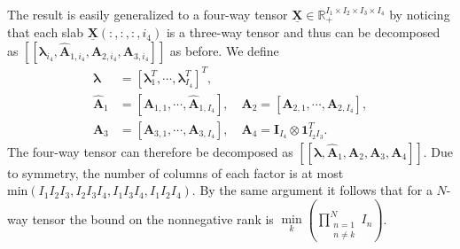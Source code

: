 \documentclass[journal]{IEEEtran}
\begin{document}
{\begin{IEEEproof}
The result is easily generalized to a {four-way} tensor $\underline{\mathbf{X}} \in \mathbb{R}_+^{I_1 \times I_2 \times I_3 \times I_4}$ by noticing that each slab  $\underline{\mathbf{X}}(:,:,:,i_4)$ is a {three-way} tensor and thus can be decomposed as $[\![\boldsymbol{\lambda}_{i_4},\widehat{\mathbf{A}}_{1,i_4},\mathbf{A}_{2,i_4},\mathbf{A}_{3,i_4}]\!]$ as before. We define
\begin{equation*}
\begin{aligned}
\boldsymbol{\lambda} &= [\boldsymbol{\lambda}_1^T,\cdots,\boldsymbol{\lambda}_{I_4}^T]^T, \\ 
\widehat{\mathbf{A}}_1 &= [\widehat{\mathbf{A}}_{1,1},  \cdots, \widehat{\mathbf{A}}_{1,I_4}], \quad
\mathbf{A}_2 = [\mathbf{A}_{2,1},  \cdots, \mathbf{A}_{2,I_4}], \\
\mathbf{A}_3 &= [\mathbf{A}_{3,1},  \cdots, \mathbf{A}_{3,I_4}], \quad
\mathbf{A}_4 = \mathbf{I}_{I_4} \otimes \mathbf{1}_{I_2I_3}^T.
\end{aligned}
\end{equation*}
The {four-way} tensor can therefore be decomposed as $[\![\boldsymbol{\lambda},\widehat{\mathbf{A}}_1,\mathbf{A}_2,\mathbf{A}_3,\mathbf{A}_4]\!]$. Due to symmetry, the number of columns of each factor is at most $\textrm{min}(I_1I_2I_3,I_2I_3I_4,I_1I_3I_4,I_1I_2I_4)$. By the same argument it follows that for a $N$-way tensor the bound on the nonnegative rank is $\underset{k}{\min}(\prod_{\substack{n=1 \\ n \neq k}}^N I_n)$.
\end{IEEEproof}}
\end{document}
